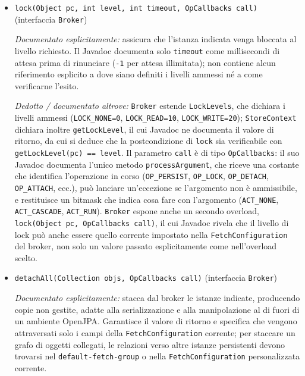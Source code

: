 \begin{itemize}[itemsep=12pt, parsep=7pt]
    \item \texttt{lock(Object pc, int level, int timeout, OpCallbacks call)}
    (interfaccia \texttt{Broker})

    \textit{Documentato esplicitamente:} assicura che l'istanza indicata venga bloccata al
    livello richiesto. Il Javadoc documenta solo \texttt{timeout} come millisecondi di
    attesa prima di rinunciare (\texttt{-1} per attesa illimitata); non contiene alcun
    riferimento esplicito a dove siano definiti i livelli ammessi né a come verificarne
    l'esito.

    \textit{Dedotto / documentato altrove:}
    \texttt{Broker} estende \texttt{LockLevels}, che dichiara i livelli ammessi
    (\texttt{LOCK\_NONE=0}, \texttt{LOCK\_READ=10}, \texttt{LOCK\_WRITE=20});
    \texttt{StoreContext} dichiara inoltre \texttt{getLockLevel}, il cui Javadoc ne documenta
    il valore di ritorno, da cui si deduce che la postcondizione di \texttt{lock} sia
    verificabile con \texttt{getLockLevel(pc) == level}. Il parametro \texttt{call} è di tipo
    \texttt{OpCallbacks}: il suo Javadoc documenta l'unico
    metodo \texttt{processArgument}, che riceve una costante che identifica l'operazione in
    corso (\texttt{OP\_PERSIST}, \texttt{OP\_LOCK}, \texttt{OP\_DETACH}, \texttt{OP\_ATTACH},
    ecc.), può lanciare un'eccezione se l'argomento non è ammissibile, e restituisce un
    bitmask che indica cosa fare con l'argomento (\texttt{ACT\_NONE}, \texttt{ACT\_CASCADE},
    \texttt{ACT\_RUN}). \texttt{Broker} espone anche un secondo overload,
    \texttt{lock(Object pc, OpCallbacks call)}, il cui Javadoc rivela che il livello di lock
    può anche essere quello corrente impostato nella \texttt{FetchConfiguration} del broker,
    non solo un valore passato esplicitamente come nell'overload scelto.

    \item \texttt{detachAll(Collection objs, OpCallbacks call)}
    (interfaccia \texttt{Broker})

    \textit{Documentato esplicitamente:} stacca dal broker le istanze indicate, producendo
    copie non gestite, adatte alla serializzazione e alla manipolazione al di fuori di un
    ambiente OpenJPA. Garantisce il valore di ritorno e specifica che vengono attraversati
    solo i campi della \texttt{FetchConfiguration} corrente; per staccare un grafo di
    oggetti collegati, le relazioni verso altre istanze persistenti devono trovarsi nel
    \texttt{default-fetch-group} o nella \texttt{FetchConfiguration} personalizzata corrente.


\end{itemize}
